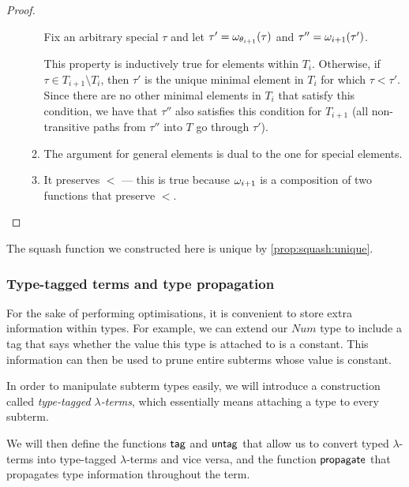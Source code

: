 \documentclass[main.tex]{subfiles}
\begin{document}
\begin{proof}
\begin{itemize}
\begin{enumerate}
                    Fix an arbitrary special $\tau$ and let
                    $\tau' = \omega_{\theta_{i + 1}}(\tau)$ and
                    $\tau'' = \omega_{i + 1}(\tau')$.

                    This property is inductively true for elements within $T_i$.
                    Otherwise, if $\tau \in T_{i + 1} \setminus T_i$, then
                    $\tau'$ is the unique minimal element in
                    $T_i$ for which $\tau \less \tau'$. Since there are no other
                    minimal elements in $T_i$ that satisfy this condition,
                    we have that $\tau''$ also satisfies this condition for
                    $T_{i + 1}$ (all non-transitive paths from $\tau''$ into
                    $T$ go through $\tau'$).

                \item The argument for general elements is dual to the one
                    for special elements.
                \item It preserves $\less$ --- this is true because $\omega_{i + 1}$
                    is a composition of two functions that preserve $\less$.
            \end{enumerate}
    \end{itemize}
\end{proof}

The squash function we constructed here is unique by \cref{prop:squash:unique}.

\subsubsection{Type-tagged terms and type propagation}
\label{sec:propagation}
For the sake of performing optimisations, it is convenient to store extra
information within types. For example, we can extend our $Num$ type to include
a tag that says whether the value this type is attached to is a constant. This
information can then be used to prune entire subterms whose value is constant.

In order to manipulate subterm types easily, we will introduce a construction
called \emph{type-tagged $\lambda$-terms}, which essentially means attaching
a type to every subterm.

We will then define the functions $\mathsf{tag}$ and $\mathsf{untag}$ that allow us
to convert typed $\lambda$-terms into type-tagged $\lambda$-terms and vice
versa, and the function $\mathsf{propagate}$ that propagates type information
throughout the term.
\end{document}
